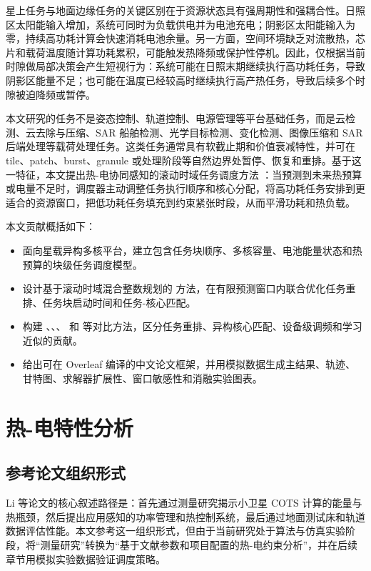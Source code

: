 星上任务与地面边缘任务的关键区别在于资源状态具有强周期性和强耦合性。日照区太阳能输入增加，系统可同时为负载供电并为电池充电；阴影区太阳能输入为零，持续高功耗计算会快速消耗电池余量。另一方面，空间环境缺乏对流散热，芯片和载荷温度随计算功耗累积，可能触发热降频或保护性停机。因此，仅根据当前时隙做局部决策会产生短视行为：系统可能在日照末期继续执行高功耗任务，导致阴影区能量不足；也可能在温度已经较高时继续执行高产热任务，导致后续多个时隙被迫降频或暂停。

本文研究的任务不是姿态控制、轨道控制、电源管理等平台基础任务，而是云检测、云去除与压缩、SAR 船舶检测、光学目标检测、变化检测、图像压缩和 SAR 后端处理等载荷处理任务。这类任务通常具有软截止期和价值衰减特性，并可在 tile、patch、burst、granule 或处理阶段等自然边界处暂停、恢复和重排。基于这一特征，本文提出热-电协同感知的滚动时域任务调度方法 \method：当预测到未来热预算或电量不足时，调度器主动调整任务执行顺序和核心分配，将高功耗任务安排到更适合的资源窗口，把低功耗任务填充到约束紧张时段，从而平滑功耗和热负载。

本文贡献概括如下：
\begin{itemize}
  \item 面向星载异构多核平台，建立包含任务块顺序、多核容量、电池能量状态和热预算的块级任务调度模型。
  \item 设计基于滚动时域混合整数规划的 \rhcfull{} 方法，在有限预测窗口内联合优化任务重排、任务块启动时间和任务-核心匹配。
  \item 构建 \fcfsg{}、\dvfs{}、\intermittent{}、\tcns{} 和 \hybrid{} 等对比方法，区分任务重排、异构核心匹配、设备级调频和学习近似的贡献。
  \item 给出可在 Overleaf 编译的中文论文框架，并用模拟数据生成主结果、轨迹、甘特图、求解器扩展性、窗口敏感性和消融实验图表。
\end{itemize}

\section{热-电特性分析}

\subsection{参考论文组织形式}

Li 等论文的核心叙述路径是：首先通过测量研究揭示小卫星 COTS 计算的能量与热瓶颈，然后提出应用感知的功率管理和热控制系统，最后通过地面测试床和轨道数据评估性能。本文参考这一组织形式，但由于当前研究处于算法与仿真实验阶段，将“测量研究”转换为“基于文献参数和项目配置的热-电约束分析”，并在后续章节用模拟实验数据验证调度策略。

